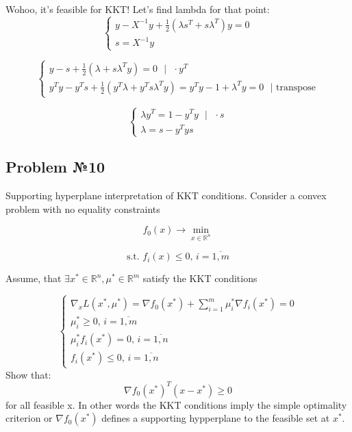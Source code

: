 Wohoo, it's feasible for KKT! Let's find lambda for that point:
\begin{equation*}
\begin{cases}
    y - X^{-1}y + \frac{1}{2}(\lambda s^T + s \lambda^T) y = 0 \\
    s = X^{-1}y 
    \end{cases}
\end{equation*}

\begin{equation*}
    \begin{cases}
    y - s + \frac{1}{2} (\lambda + s \lambda^T y ) = 0 \text{ } | \text{ } \cdot y^T \\
    y^Ty - y^Ts + \frac{1}{2} ( y^T \lambda + y^T s \lambda^T y ) = y^Ty - 1 + \lambda^Ty = 0 \text{ } | \text{ transpose}
    \end{cases}
\end{equation*}

\begin{equation*}
    \begin{cases}
        \lambda y^T = 1 - y^Ty \text{ } | \text{ } \cdot s \\
        \lambda = s - y^Tys
    \end{cases}
\end{equation*}

\subsection{Problem №10}
Supporting hyperplane interpretation of KKT conditions. Consider a convex problem with no equality constraints

\begin{equation*}
    f_0(x)  \xrightarrow{} \min\limits_{x \in \mathds{R}^n}
\end{equation*}

\begin{equation*}
   \text{s.t. } f_i(x) \leq 0\text{, } i = \overline{1, m}
\end{equation*}

Assume, that $\exists x^* \in \mathds{R}^n, \mu^* \in \mathds{R}^m$ satisfy the KKT conditions

\begin{equation*}
    \begin{cases}
        \nabla_x L(x^*, \mu^*) = \nabla f_0(x^*) + \sum\limits_{i=1}^m \mu_i^* \nabla f_i(x^*) = 0 \\
        \mu_i^* \geq 0\text{, } i = \overline{1, m} \\
        \mu_i^*f_i(x^*) = 0\text{, } i = \overline{1, n} \\
        f_i(x^*) \leq 0 \text{, } i = \overline{1, n}
    \end{cases}
\end{equation*}
Show that:
\begin{equation*}
    \nabla f_0(x^*)^T(x - x^*) \geq 0 
\end{equation*}
for all feasible x. In other words the KKT conditions imply the simple optimality criterion or $\nabla f_0(x^*)$ defines a supporting hypperplane to the feasible set at $x^*$. 

